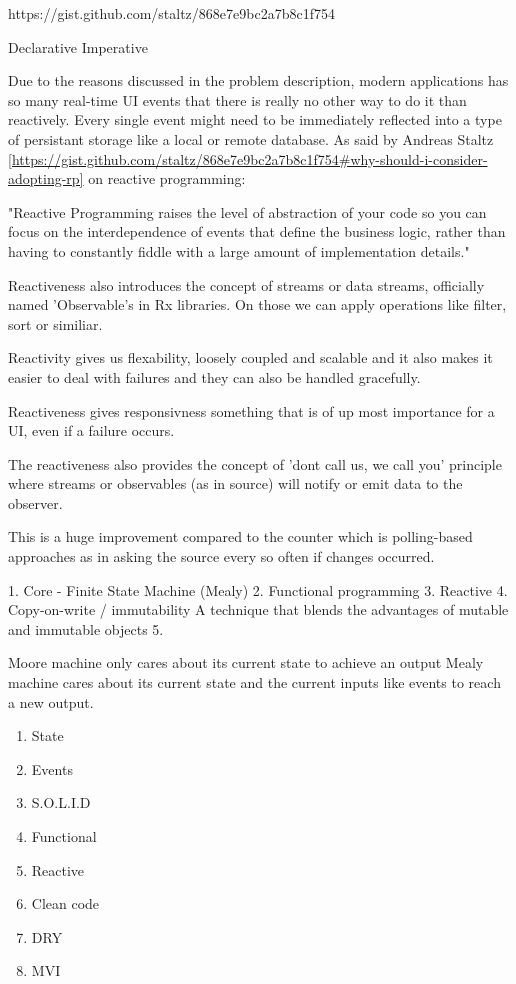 https://gist.github.com/staltz/868e7e9bc2a7b8c1f754


Declarative
Imperative

Due to the reasons discussed in the problem description, modern applications has 
so many real-time UI events that there is really no 
other way to do it than reactively. Every single event might need to be immediately
reflected into a type of persistant storage like a local or remote database.
As said by Andreas Staltz \ref{https://gist.github.com/staltz/868e7e9bc2a7b8c1f754#why-should-i-consider-adopting-rp} on
reactive programming:

"Reactive Programming raises the level of abstraction of your code so you can 
focus on the interdependence of events that define the business logic, 
rather than having to constantly fiddle with a large amount of implementation details."

Reactiveness also introduces the concept of streams or data streams, officially named 'Observable's in Rx libraries. On those we can apply operations
like filter, sort or similiar.

Reactivity gives us flexability, loosely coupled and scalable and it also makes it
easier to deal with failures and they can also be handled gracefully.

Reactiveness gives responsivness something that is of up most importance for a
UI, even if a failure occurs.

The reactiveness also provides the concept of 'dont call us, we call you' principle
where streams or observables (as in source) will notify or emit data to the observer.
 
This is a huge improvement compared to the counter which is polling-based approaches
as in asking the source every so often if changes occurred.

1. Core - Finite State Machine (Mealy)
2. Functional programming
3. Reactive
4. Copy-on-write / immutability A technique that blends the advantages of mutable and immutable objects
5.

Moore machine only cares about its current state to achieve an output
Mealy machine cares about its current state and the current inputs like events to reach
a new output.

\begin{enumerate}

    \item State
    \item Events
    \item S.O.L.I.D
    \item Functional 
    \item Reactive
    \item Clean code
    \item DRY
    \item MVI

\end{enumerate}

